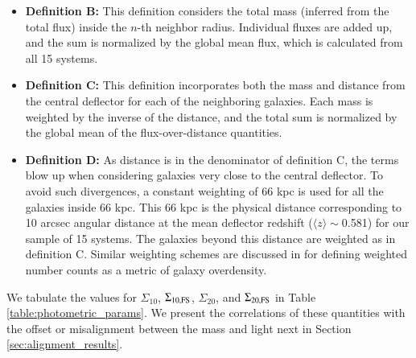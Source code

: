 \documentclass{aa}
\begin{document}
\begin{itemize}
    \item  \textbf{Definition B:} This definition considers the total mass (inferred from the total flux) inside the $n$-th neighbor radius. Individual fluxes are added up, and the sum is normalized by the global mean flux, which is calculated from all 15 systems.
    \\
    \item  \textbf{Definition C:} This definition incorporates both the mass and distance from the central deflector for each of the neighboring galaxies. Each mass is weighted by the inverse of the distance, and the total sum is normalized by the global mean of the flux-over-distance quantities.
    \\
    \item \textbf{Definition D:} As distance is in the denominator of definition C, the terms blow up when considering galaxies very close to the central deflector. To avoid such divergences, a constant weighting of 66 kpc is used for all the galaxies inside 66 kpc. This 66 kpc is the physical distance corresponding to 10 arcsec angular distance at the mean deflector redshift ($\langle z \rangle \sim$0.581) for our sample of 15 systems. The galaxies beyond this distance are weighted as in definition C. Similar weighting schemes are discussed in \citet{Greene13} for defining weighted number counts as a metric of galaxy overdensity.
\end{itemize}



We tabulate the values for $\Sigma_{10}$, $\Sigma_{10, \rm FS}$, $\Sigma_{20}$, and $\Sigma_{20, \rm FS}$ in Table \ref{table:photometric_params}. We present the correlations of these quantities with the offset or misalignment between the mass and light next in Section \ref{sec:alignment_results}.
\end{document}
